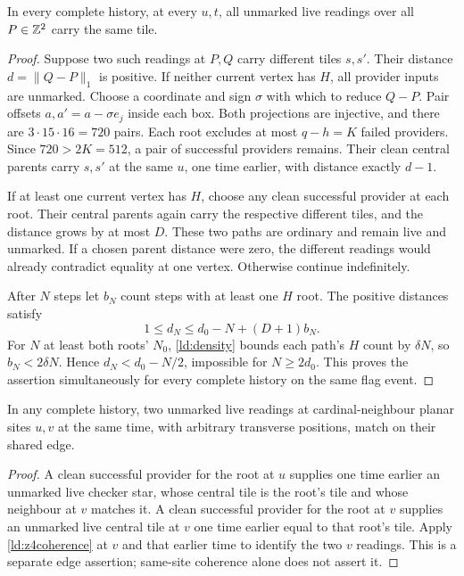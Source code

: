 \begin{lemma}\label{ld:z4coherence}
In every complete history, at every $u,t$, all unmarked live readings over all $P\in\mathbb{Z}^2$ carry the same tile.
\end{lemma}
\begin{proof}
Suppose two such readings at $P,Q$ carry different tiles $s,s'$. Their distance $d=\|Q-P\|_1$ is positive. If neither current vertex has $H$, all provider inputs are unmarked. Choose a coordinate and sign $\sigma$ with which to reduce $Q-P$. Pair offsets $a,a'=a-\sigma e_j$ inside each box. Both projections are injective, and there are $3\cdot15\cdot16=720$ pairs. Each root excludes at most $q-h=K$ failed providers. Since $720>2K=512$, a pair of successful providers remains. Their clean central parents carry $s,s'$ at the same $u$, one time earlier, with distance exactly $d-1$.

If at least one current vertex has $H$, choose any clean successful provider at each root. Their central parents again carry the respective different tiles, and the distance grows by at most $D$. These two paths are ordinary and remain live and unmarked. If a chosen parent distance were zero, the different readings would already contradict equality at one vertex. Otherwise continue indefinitely.

After $N$ steps let $b_N$ count steps with at least one $H$ root. The positive distances satisfy
\begin{equation}\label{ld:drift}
 1\le d_N\le d_0-N+(D+1)b_N.
\end{equation}
For $N$ at least both roots' $N_0$, \cref{ld:density} bounds each path's $H$ count by $\delta N$, so $b_N<2\delta N$. Hence $d_N<d_0-N/2$, impossible for $N\ge2d_0$. This proves the assertion simultaneously for every complete history on the same flag event.
\end{proof}

\begin{lemma}\label{ld:z4edges}
In any complete history, two unmarked live readings at cardinal-neighbour planar sites $u,v$ at the same time, with arbitrary transverse positions, match on their shared edge.
\end{lemma}
\begin{proof}
A clean successful provider for the root at $u$ supplies one time earlier an unmarked live checker star, whose central tile is the root's tile and whose neighbour at $v$ matches it. A clean successful provider for the root at $v$ supplies an unmarked live central tile at $v$ one time earlier equal to that root's tile. Apply \cref{ld:z4coherence} at $v$ and that earlier time to identify the two $v$ readings. This is a separate edge assertion; same-site coherence alone does not assert it.
\end{proof}

